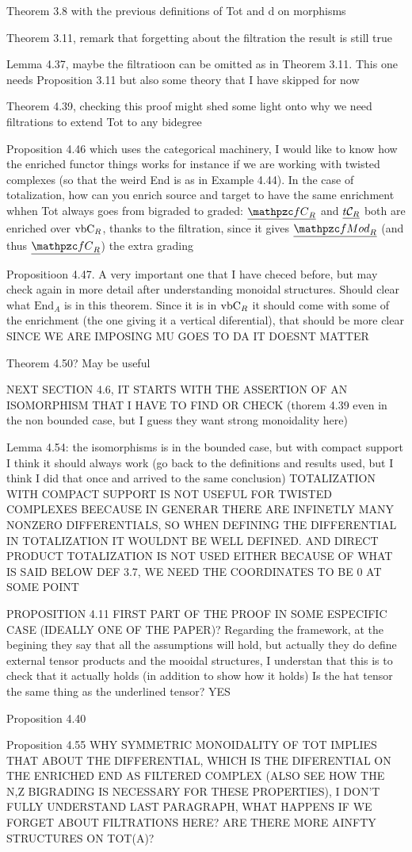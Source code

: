 \documentclass[twoside]{article}
\begin{document}
Theorem 3.8 with the previous definitions of Tot and d on morphisms

Theorem 3.11, remark that forgetting about the filtration the result is still true

Lemma 4.37, maybe the filtratioon can be omitted as in Theorem 3.11. This one needs Proposition 3.11 but also some theory that I have skipped for now

Theorem 4.39, checking this proof might shed some light onto why we need filtrations to extend Tot to any bidegree

Proposition 4.46 which uses the categorical machinery, I would like to know how the enriched functor things works for instance if we are working with twisted complexes (so that the weird End is as in Example 4.44). In the case of totalization, how can you enrich source and target to have the same enrichment whhen Tot always goes from bigraded to graded: $\ufC$ and $\underline{t\mathcal{C}_R}$ both are enriched over $\mathrm{vbC}_R$, thanks to the filtration, since it gives $\ufMod$ (and thus $\ufC$) the extra grading

Propositioon 4.47. A very important one that I have checed before, but may check again in more detail after understanding monoidal structures. Should clear what $\mathrm{End}_A$ is in this theorem. Since it is in $\mathrm{vbC}_R$ it should come with some of the enrichment (the one giving it a vertical diferential), that should be more clear SINCE WE ARE IMPOSING MU GOES TO DA IT DOESNT MATTER

Theorem 4.50? May be useful

NEXT SECTION 4.6, IT STARTS WITH THE ASSERTION OF AN ISOMORPHISM THAT I HAVE TO FIND OR CHECK (thorem 4.39 even in the non bounded case, but I guess they want strong monoidality here)

Lemma 4.54: the isomorphisms is in the bounded case, but with compact support I think it should always work (go back to the definitions and results used, but I think I did that once and arrived to the same conclusion) TOTALIZATION WITH COMPACT SUPPORT IS NOT USEFUL FOR TWISTED COMPLEXES BEECAUSE IN GENERAR  THERE ARE INFINETLY MANY NONZERO DIFFERENTIALS, SO WHEN DEFINING THE DIFFERENTIAL IN TOTALIZATION IT WOULDNT BE WELL DEFINED. AND DIRECT PRODUCT TOTALIZATION IS NOT USED EITHER BECAUSE OF WHAT IS SAID BELOW DEF 3.7, WE NEED THE COORDINATES TO BE 0 AT SOME POINT

PROPOSITION 4.11 FIRST PART OF THE PROOF IN SOME ESPECIFIC CASE (IDEALLY ONE OF THE PAPER)?
Regarding the framework, at the begining they say that all the assumptions will hold, but actually they do define external tensor products and the mooidal structures, I understan that this is to check that it actually holds (in addition to show how it holds) Is the hat tensor the same thing as the underlined tensor? YES

Proposition 4.40

Proposition 4.55 WHY SYMMETRIC MONOIDALITY OF TOT IMPLIES THAT ABOUT THE DIFFERENTIAL, WHICH IS THE DIFERENTIAL ON THE ENRICHED END AS FILTERED COMPLEX (ALSO SEE HOW THE N,Z BIGRADING IS NECESSARY FOR THESE PROPERTIES), I DON'T FULLY UNDERSTAND LAST PARAGRAPH, WHAT HAPPENS IF WE FORGET ABOUT FILTRATIONS HERE? ARE THERE MORE AINFTY STRUCTURES ON TOT(A)?
\end{document}
